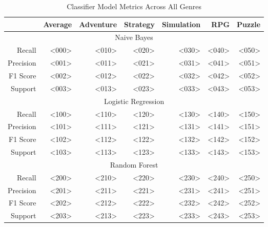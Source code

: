 \begin{table}[h]
    \centering
    \begin{tabular}{r|r|r|r|r|r|r}
        & Average & Adventure & Strategy & Simulation & RPG & Puzzle \\\hline
        \multicolumn{7}{c}{Naive Bayes} \\\hline
        Recall      & <000> & <010> & <020> & <030> & <040> & <050> \\
        Precision   & <001> & <011> & <021> & <031> & <041> & <051> \\
        F1 Score    & <002> & <012> & <022> & <032> & <042> & <052> \\
        Support     & <003> & <013> & <023> & <033> & <043> & <053> \\\hline
        \multicolumn{7}{c}{Logistic Regression} \\\hline
        Recall      & <100> & <110> & <120> & <130> & <140> & <150> \\
        Precision   & <101> & <111> & <121> & <131> & <141> & <151> \\
        F1 Score    & <102> & <112> & <122> & <132> & <142> & <152> \\
        Support     & <103> & <113> & <123> & <133> & <143> & <153> \\\hline
        \multicolumn{7}{c}{Random Forest} \\\hline
        Recall      & <200> & <210> & <220> & <230> & <240> & <250> \\
        Precision   & <201> & <211> & <221> & <231> & <241> & <251> \\
        F1 Score    & <202> & <212> & <222> & <232> & <242> & <252> \\
        Support     & <203> & <213> & <223> & <233> & <243> & <253> \\\hline
    \end{tabular}
    \caption{Classifier Model Metrics Across All Genres}
    \label{tab:combined_model_metrics}
\end{table}